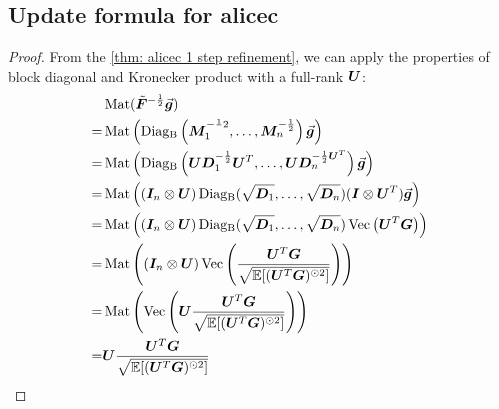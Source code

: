 \subsection{Update formula for \gls{alicec}}
\label{subapp: update of generlized adam}
\begin{proof}
    From the \cref{thm: alicec 1 step refinement}, we can apply the properties of block diagonal and Kronecker product with a full-rank ${\bm{U}}$:
    \begin{align*}
        &\operatorname{Mat}(\tilde{\bm{F}}^{-\frac{1}{2}}\vec{\bm{g}})\\
        =& \operatorname{Mat}\left(\operatorname{Diag_B}\left({\bm{M}}_1^{-\frac{1}{}2},\ldots, {\bm{M}}_n^{-\frac{1}{2}}\right)\vec{\bm{g}}\right)\\
        =&\operatorname{Mat}\left(\operatorname{Diag_B}\left({\bm{U}}{\bm{D}}_1^{-\frac{1}{2}}{\bm{U}}^T,\ldots,{\bm{U}}{\bm{D}}_{n}^{-\frac{1}{2}{\bm{U}}^T}\right)\vec{\bm{g}}\right)\\
        =&\operatorname{Mat}\left(({\bm{I}}_n\otimes {\bm{U}})\operatorname{Diag_B}(\sqrt{{\bm{D}}_1},\ldots,\sqrt{{\bm{D}}_n})({\bm{I}}\otimes {\bm{U}}^T)\vec{\bm{g}}\right)\\
        =&\operatorname{Mat}\left(({\bm{I}}_n\otimes {\bm{U}})\operatorname{Diag_B}(\sqrt{{\bm{D}}_1},\ldots,\sqrt{{\bm{D}}_n})\operatorname{Vec}\left({\bm{U}}^T{\bm{G}}\right)\right)\\
        =&\operatorname{Mat}\left(({\bm{I}}_n\otimes {\bm{U}})\operatorname{Vec}\left(\frac{{\bm{U}}^T{\bm{G}}}{\sqrt{\mathbb{E}[({\bm{U}}^T{\bm{G}})^{\odot 2}]}}\right)\right)\\
        =&\operatorname{Mat}\left(\operatorname{Vec}\left({\bm{U}}\frac{{\bm{U}}^T{\bm{G}}}{\sqrt{\mathbb{E}[({\bm{U}}^T{\bm{G}})^{\odot 2}]}}\right)\right)\\
        =& {\bm{U}}\frac{{\bm{U}}^T{\bm{G}}}{\sqrt{\mathbb{E}[({\bm{U}}^T{\bm{G}})^{\odot 2}]}}
    \end{align*}
\end{proof}

